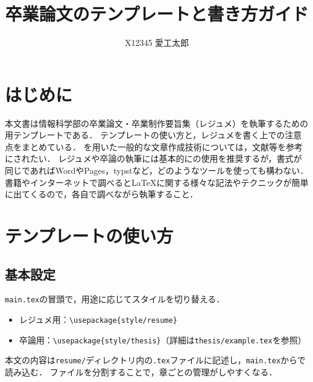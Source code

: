 
\title{卒業論文のテンプレートと書き方ガイド} %
\subtitle{} %

\author{%
    X12345 愛工太郎%
}



\maketitle

\section{はじめに}
\label{sec:intro}
本文書は情報科学部の卒業論文・卒業制作要旨集（レジュメ）を執筆するための\upLaTeX 用テンプレートである．
テンプレートの使い方と，レジュメを書く上での注意点をまとめている．
\upLaTeX を用いた一般的な文章作成技術については，文献\cite{tex}等を参考にされたい．
レジュメや卒論の執筆には基本的に\upLaTeX の使用を推奨するが，書式が同じであればWordやPages，typstなど，どのようなツールを使っても構わない．
書籍やインターネットで調べると\LaTeX に関する様々な記法やテクニックが簡単に出てくるので，各自で調べながら執筆すること．

\section{テンプレートの使い方}
\label{sec:usage}

\subsection{基本設定}
\label{subsec:basic}
\texttt{main.tex}の冒頭で，用途に応じてスタイルを切り替える．
\begin{itemize}
    \item レジュメ用：\verb|\usepackage{style/resume}|
    \item 卒論用：\verb|\usepackage{style/thesis}|（詳細は\texttt{thesis/example.tex}を参照）
\end{itemize}
本文の内容は\texttt{resume/}ディレクトリ内の\texttt{.tex}ファイルに記述し，\texttt{main.tex}から\verb||で読み込む．
ファイルを分割することで，章ごとの管理がしやすくなる．

